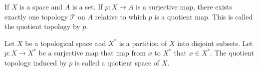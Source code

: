 \begin{definition}
    If $X$ is a space and $A$ is a set. If $p: X \rightarrow A$ is a surjective map, there exists exactly one topology $\mathcal{T}$ on $A$ relative to which $p$ is a quotient map. This is called the quotient topology by $p$.
\end{definition}

\begin{definition}
    Let $X$ be a topological space and $X^*$ is a partition of $X$ into disjoint subsets. Let $p:X \rightarrow X^*$ be a surjective map that map from $x$ to $X^*$ that $x \in X^*$. The quotient topology induced by $p$ is called a quotient space of $X$.
\end{definition}







